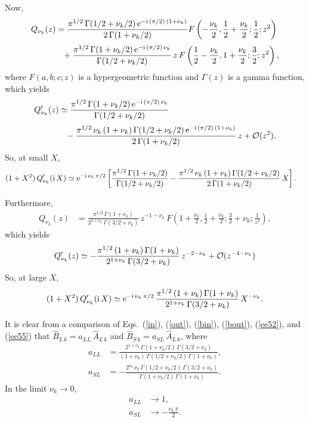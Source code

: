 \documentclass[12pt,prb,aps]{revtex4-1}
\begin{document}
Now,\cite{eda}
\begin{align}
Q_{\nu_k}(z)&= \frac{\pi^{1/2}\,\Gamma(1/2+\nu_k/2)\,{\rm e}^{-{\rm i}\,(\pi/2)\,(1+\nu_k)}}{2\,\Gamma(1+\nu_k/2)}F\left(-\frac{\nu_k}{2},\frac{1}{2}+\frac{\nu_k}{2};\frac{1}{2};z^2\right)\nonumber\\[0.5ex]
&\phantom{=}+\frac{\pi^{1/2}\,\Gamma(1+\nu_k/2)\,{\rm e}^{-{\rm i}\,(\pi/2)\,\nu_k}}{\Gamma(1/2+\nu_k/2)}\,z\,F\left(\frac{1}{2}-\frac{\nu_k}{2},1+\frac{\nu_k}{2};\frac{3}{2};z^2\right),
\end{align}
where $F(a,b;c;z)$ is a hypergeometric function and $\Gamma(z)$ is a gamma function,\cite{abramb,abramd}
which yields
\begin{align}
Q_{\nu_k}'(z)&\simeq\frac{\pi^{1/2}\,\Gamma(1+\nu_k/2)\,{\rm e}^{-{\rm i}\,(\pi/2)\,\nu_k}}{\Gamma(1/2+\nu_k/2)}\nonumber\\[0.5ex]
&\phantom{=}- \frac{\pi^{1/2}\,\nu_k\,(1+\nu_k)\,\Gamma(1/2+\nu_k/2)\,{\rm e}^{-{\rm i}\,(\pi/2)\,(1+\nu_k)}}{2\,\Gamma(1+\nu_k/2)}\,z +{\cal O}(z^2).
\end{align}
So, at small $X$, 
\begin{align}\label{ee52}
(1+X^2)\,Q_{\nu_k}'({\rm i}\,X)&\simeq {\rm e}^{-{\rm i}\,\nu_k\,\pi/2}\left[\frac{\pi^{1/2}\,\Gamma(1+\nu_k/2)}{\Gamma(1/2+\nu_k/2)}
-\frac{\pi^{1/2}\,\nu_k\,(1+\nu_k)\,\Gamma(1/2+\nu_k/2)}{2\,\Gamma(1+\nu_k/2)}\,X\right]. 
\end{align}

Furthermore,\cite{eda}
\begin{align}
Q_{\nu_k}(z) &= \frac{\pi^{1/2}\,{\Gamma}(1+\nu_k)}{2^{1+\nu_k}\,\Gamma(3/2+\nu_k)}\,z^{-1-\nu_k}\,F\left(1+\frac{\nu_k}{2},\frac{1}{2}+\frac{\nu_k}{2};\frac{3}{2}+\nu_k;\frac{1}{z^2}\right),
\end{align}
which yields
\begin{align}
Q_{\nu_k}'(z)\simeq -\frac{\pi^{1/2}\,(1+\nu_k)\,{\Gamma}(1+\nu_k)}{2^{1+\nu_k}\,\Gamma(3/2+\nu_k)}\,z^{-2-\nu_k} + {\cal O}(z^{-4-\nu_k})
\end{align}
So, at large $X$, 
\begin{align}\label{ee55}
(1+X^2)\,Q_{\nu_k}'({\rm i}\,X) \simeq {\rm e}^{-{\rm i}\,\nu_k\,\pi/2}\,\frac{\pi^{1/2}\,(1+\nu_k)\,\Gamma(1+\nu_k)}{2^{1+\nu_k}\,\Gamma(3/2+\nu_k)}\,X^{-\nu_k}.
\end{align}

It is clear from a comparison of Eqs.~(\ref{in}), (\ref{out}), (\ref{bin}), (\ref{bout}), (\ref{ee52}), and (\ref{ee55}) that
$\hat{B}_{L\,k} = a_{LL}\,\hat{A}_{L\,k}$ and 
$\hat{B}_{S\,k}= a_{SL}\,\hat{A}_{L\,k}$,
where
\begin{align}
a_{LL} &= \frac{2^{1+\nu_k}\,\Gamma(1+\nu_k/2)\,\Gamma(3/2+\nu_k)}{(1+\nu_k)\,\Gamma(1/2+\nu_k/2)\,\Gamma(1+\nu_k)},\\[0.5ex]
a_{SL}&=- \frac{2^{\nu_k}\,\nu_k\,\Gamma(1/2+\nu_k/2)\,\Gamma(3/2+\nu_k)}{\Gamma(1+\nu_k/2)\,\Gamma(1+\nu_k)}.
\end{align}
In the limit $\nu_k\rightarrow 0$,
\begin{align}\label{ee32}
a_{LL}&\rightarrow 1,\\[0.5ex]
a_{SL} &\rightarrow - \frac{\nu_k\,\pi}{2}.\label{ee33}
\end{align}
\end{document}
